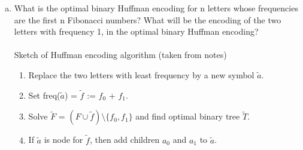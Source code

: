 \documentclass[a4paper]{article}
\begin{document}
\begin{enumerate}[(a)]
    \item What is the optimal binary Huffman encoding for n letters whose frequencies are the first n Fibonacci numbers? What will be the encoding of the two letters with frequency 1, in the optimal binary Huffman encoding? \\ \\ 
    Sketch of Huffman encoding algorithm (taken from notes)
    \begin{enumerate}[(1)]
        \item Replace the two letters with least frequency by a new symbol $\tilde{a}$.
        \item Set freq($\tilde{a}$) = $\tilde{f}$ := $f_0$ + $f_1$.
        \item Solve $\tilde{F}$ = $(F \cup \tilde{f}) \setminus \{f_0, f_1\}$ and find optimal binary tree $\tilde{T}$.
        \item If $\tilde{a}$ is node for $\tilde{f}$, then add children $a_0$ and $a_1$ to $\tilde{a}$.
        

\end{enumerate}
\end{enumerate}
\end{document}
